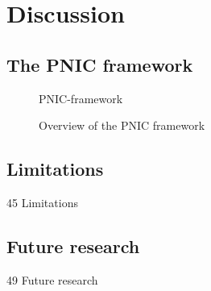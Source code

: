 \section{Discussion}
\label{sec:Discussion}

\subsection{The PNIC framework}
\label{sec:framework}
\begin{figure}[htp]
    \centering
    {PNIC-framework}
    \caption{Overview of the PNIC framework}
    \label{fig:PNIS-framework}
\end{figure}



\subsection{Limitations}
{45 Limitations}

\subsection{Future research}
{49 Future research}